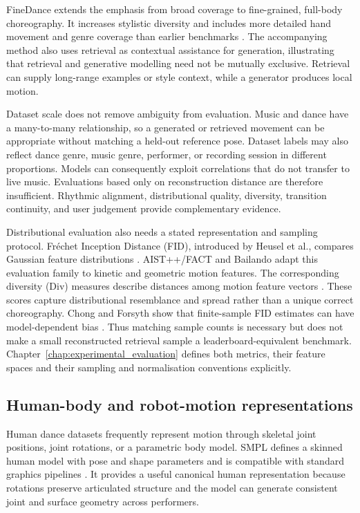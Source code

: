FineDance extends the emphasis from broad coverage to fine-grained, full-body
choreography. It increases stylistic diversity and includes more detailed hand
movement and genre coverage than earlier benchmarks \cite{li2023finedance}.
The accompanying method also uses retrieval as contextual assistance for
generation, illustrating that retrieval and generative modelling need not be
mutually exclusive. Retrieval can supply long-range examples or style context,
while a generator produces local motion.

Dataset scale does not remove ambiguity from evaluation. Music and dance have
a many-to-many relationship, so a generated or retrieved movement can be
appropriate without matching a held-out reference pose. Dataset labels may
also reflect dance genre, music genre, performer, or recording session in
different proportions. Models can consequently exploit correlations that do
not transfer to live music. Evaluations based only on reconstruction distance
are therefore insufficient. Rhythmic alignment, distributional quality,
diversity, transition continuity, and user judgement provide complementary
evidence.

Distributional evaluation also needs a stated representation and sampling
protocol. Fr\'echet Inception Distance (FID), introduced by Heusel et al.,
compares Gaussian feature distributions \cite{heusel2017gans}. AIST++/FACT and
Bailando adapt this evaluation family to kinetic and geometric motion
features. The corresponding diversity (Div) measures describe distances among
motion feature vectors \cite{li2021ai,siyao2022bailando}. These scores capture
distributional resemblance and spread rather than a unique correct choreography.
Chong and Forsyth show that finite-sample FID estimates can have model-dependent
bias \cite{chong2020effectively}. Thus matching sample counts is necessary but does not
make a small reconstructed retrieval sample a leaderboard-equivalent benchmark.
Chapter~\ref{chap:experimental_evaluation} defines both metrics, their feature
spaces and their sampling and normalisation conventions explicitly.

\subsection{Human-body and robot-motion representations}
\label{subsec:lit_motion_representations}

Human dance datasets frequently represent motion through skeletal joint
positions, joint rotations, or a parametric body model. SMPL defines a skinned
human model with pose and shape parameters and is compatible with standard
graphics pipelines \cite{loper2023smpl}. It provides a useful canonical human
representation because rotations preserve articulated structure and the model
can generate consistent joint and surface geometry across performers.

